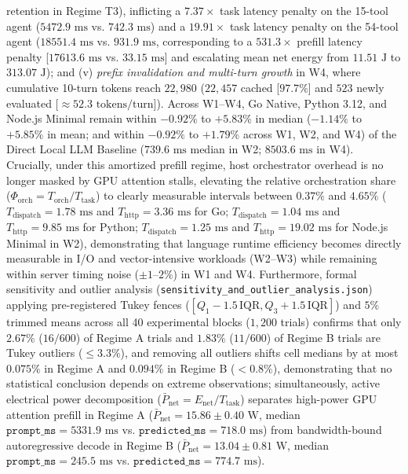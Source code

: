 \documentclass[preprint,12pt,3p]{elsarticle}
\begin{document}
\begin{itemize}
retention in Regime T3), inflicting a $7.37\times$ task latency penalty on the 15-tool agent ($5472.9\text{ ms}$ vs. $742.3\text{ ms}$) and a $19.91\times$ task latency penalty on the 54-tool agent ($18551.4\text{ ms}$ vs. $931.9\text{ ms}$, corresponding to a $531.3\times$ prefill latency penalty [$17613.6\text{ ms}$ vs. $33.15\text{ ms}$] and escalating mean net energy from $11.51\text{ J}$ to $313.07\text{ J}$); and (v) \textit{prefix invalidation and multi-turn growth} in W4, where cumulative 10-turn tokens reach $22{,}980$ ($22{,}457$ cached [$97.7\%$] and $523$ newly evaluated [$\approx 52.3\text{ tokens/turn}$]). Across W1--W4, Go Native, Python 3.12, and Node.js Minimal remain within $-0.92\%$ to $+5.83\%$ in median ($-1.14\%$ to $+5.85\%$ in mean; and within $-0.92\%$ to $+1.79\%$ across W1, W2, and W4) of the Direct Local LLM Baseline ($739.6\text{ ms}$ median in W2; $8503.6\text{ ms}$ in W4). Crucially, under this amortized prefill regime, host orchestrator overhead is no longer masked by GPU attention stalls, elevating the relative orchestration share ($\Phi_{\text{orch}} = T_{\text{orch}} / T_{\text{task}}$) to clearly measurable intervals between $0.37\%$ and $4.65\%$ ($T_{\text{dispatch}} = 1.78\text{ ms}$ and $T_{\text{http}} = 3.36\text{ ms}$ for Go; $T_{\text{dispatch}} = 1.04\text{ ms}$ and $T_{\text{http}} = 9.85\text{ ms}$ for Python; $T_{\text{dispatch}} = 1.25\text{ ms}$ and $T_{\text{http}} = 19.02\text{ ms}$ for Node.js Minimal in W2), demonstrating that language runtime efficiency becomes directly measurable in I/O and vector-intensive workloads (W2--W3) while remaining within server timing noise ($\pm 1\text{--}2\%$) in W1 and W4. Furthermore, formal sensitivity and outlier analysis (\texttt{sensitivity\_and\_outlier\_analysis.json}) applying pre-registered Tukey fences ($[Q_1 - 1.5\,\text{IQR}, Q_3 + 1.5\,\text{IQR}]$) and $5\%$ trimmed means across all 40 experimental blocks ($1{,}200$ trials) confirms that only $2.67\%$ ($16/600$) of Regime A trials and $1.83\%$ ($11/600$) of Regime B trials are Tukey outliers ($\le 3.3\%$), and removing all outliers shifts cell medians by at most $0.075\%$ in Regime A and $0.094\%$ in Regime B ($< 0.8\%$), demonstrating that no statistical conclusion depends on extreme observations; simultaneously, active electrical power decomposition ($\bar{P}_{\text{net}} = E_{\text{net}} / T_{\text{task}}$) separates high-power GPU attention prefill in Regime A ($\bar{P}_{\text{net}} = 15.86 \pm 0.40\text{ W}$, median $\texttt{prompt\_ms} = 5331.9\text{ ms}$ vs. $\texttt{predicted\_ms} = 718.0\text{ ms}$) from bandwidth-bound autoregressive decode in Regime B ($\bar{P}_{\text{net}} = 13.04 \pm 0.81\text{ W}$, median $\texttt{prompt\_ms} = 245.5\text{ ms}$ vs. $\texttt{predicted\_ms} = 774.7\text{ ms}$).
\end{itemize}
\end{document}

